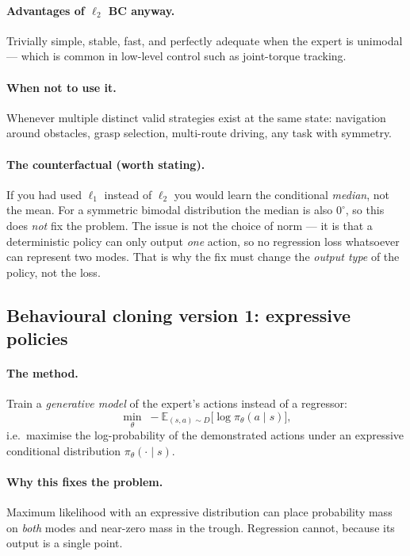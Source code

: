 \documentclass[11pt,a4paper]{article}
\begin{document}
\paragraph{Advantages of $\ell_2$ BC anyway.} Trivially simple, stable, fast,
and perfectly adequate when the expert is unimodal --- which is common in
low-level control such as joint-torque tracking.

\paragraph{When not to use it.} Whenever multiple distinct valid strategies
exist at the same state: navigation around obstacles, grasp selection,
multi-route driving, any task with symmetry.

\paragraph{The counterfactual (worth stating).} If you had used $\ell_1$
instead of $\ell_2$ you would learn the conditional \emph{median}, not the
mean. For a symmetric bimodal distribution the median is also $0^\circ$, so
this does \emph{not} fix the problem. The issue is not the choice of norm ---
it is that a deterministic policy can only output \emph{one} action, so no
regression loss whatsoever can represent two modes. That is why the fix must
change the \emph{output type} of the policy, not the loss.

\subsection{Behavioural cloning version 1: expressive policies}

\paragraph{The method.} Train a \emph{generative model} of the expert's
actions instead of a regressor:
\[
\min_\theta\; -\mathbb E_{(s,a)\sim D}\bigl[\log\pi_\theta(a\mid s)\bigr],
\]
i.e.\ maximise the log-probability of the demonstrated actions under an
expressive conditional distribution $\pi_\theta(\cdot\mid s)$.

\paragraph{Why this fixes the problem.} Maximum likelihood with an expressive
distribution can place probability mass on \emph{both} modes and near-zero
mass in the trough. Regression cannot, because its output is a single point.
\end{document}
